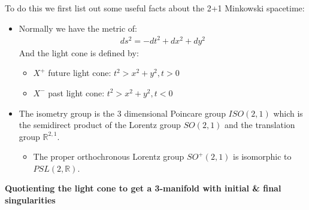 To do this we first list out some useful facts about the 2+1
Minkowski spacetime:
\begin{itemize}
  \item Normally we have the metric of:
    \begin{align}
      ds^2 = -dt^2 + dx^2 + dy^2
    \end{align}
    And the light cone is defined by:
    \begin{itemize}
      \item $ X^+ $ future light cone: $ t^2 > x^2 + y^2, t > 0 $
      \item $ X^- $ past light cone: $ t^2 > x^2 + y^2, t < 0 $
    \end{itemize}
  \item The isometry group is the 3 dimensional Poincare group $
    ISO(2,1) $ which is the semidirect product of
    the Lorentz group $ SO(2,1) $ and the translation group $
    \mathbb{R}^{2,1} $.
    \begin{itemize}
      \item The proper orthochronous Lorentz group $ SO^+(2,1) $ is
        isomorphic to $ PSL(2,\mathbb{R}) $.
    \end{itemize}
\end{itemize}
\textbf{Quotienting the light cone to get a 3-manifold with initial \&
final singularities}

